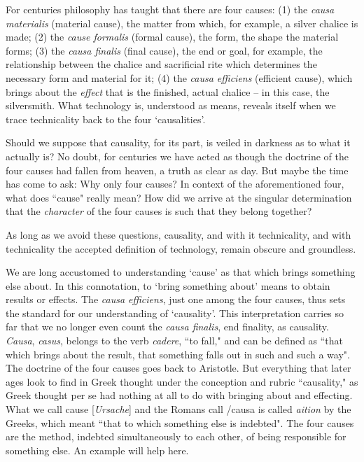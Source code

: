 \documentclass[12pt]{article}
\begin{document}
For centuries philosophy has taught that there are four causes: (1) the \textit{causa materialis} (material cause), the matter from which, for example, a silver chalice is made; (2) the \textit{cause formalis} (formal cause), the form, the shape the material forms; (3) the \textit{causa finalis} (final cause), the end or goal, for example, the relationship between the chalice and sacrificial rite which determines the necessary form and material for it; (4) the \textit{causa efficiens} (efficient cause), which brings about the \textit{effect} that is the finished, actual chalice -- in this case, the silversmith. What technology is, understood as means, reveals itself when we trace technicality back to the four `causalities'.

Should we suppose that causality, for its part, is veiled in darkness as to what it actually is? No doubt, for centuries we have acted as though the doctrine of the four causes had fallen from heaven, a truth as clear as day. But maybe the time has come to ask: Why only four causes? In context of the aforementioned four, what does ``cause" really mean? How did we arrive at the singular determination that the \textit{character} of the four causes is such that they belong together?

As long as we avoid these questions, causality, and with it technicality, and with technicality the accepted definition of technology, remain obscure and groundless.

We are long accustomed to understanding `cause' as that which brings something else about. In this connotation, to `bring something about' means to obtain results or effects. The \textit{causa efficiens}, just one among the four causes, thus sets the standard for our understanding of `causality'. This interpretation carries so far that we no longer even count the \textit{causa finalis}, end finality, as causality. \textit{Causa}, \textit{casus}, belongs to the verb \textit{cadere}, ``to fall," and can be defined as ``that which brings about the result, that something falls out in such and such a way". The doctrine of the four causes goes back to Aristotle. But everything that later ages look to find in Greek thought under the conception and rubric ``causality," as Greek thought per se had nothing at all to do with bringing about and effecting. What we call cause [\textit{Ursache}] and the Romans call /{causa} is called \textit{aition} by the Greeks, which meant ``that to which something else is indebted". The four causes are the method, indebted simultaneously to each other, of being responsible for something else. An example will help here.
\end{document}
